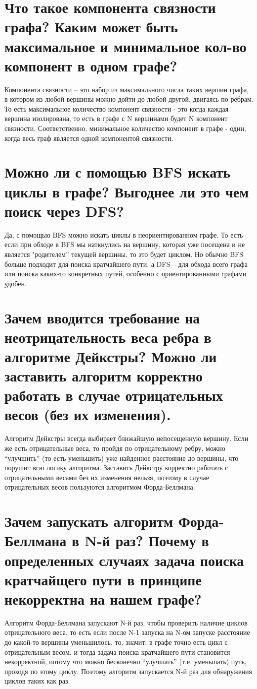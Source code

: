 \documentclass[12pt]{article}
\begin{document}
\section{Что такое компонента связности графа? Каким может быть максимальное и минимальное кол-во компонент в одном графе?}
Компонента связности – это набор из максимального числа таких вершин графа, в котором из любой вершины можно дойти до любой другой, двигаясь по рёбрам. То есть максимальное количество компонент связности - это когда каждая вершина изолирована, то есть в графе с N вершинами будет N компонент связности. Соответственно, минимальное количество компонент в графе - один, когда весь граф является одной компонентой связности.

\section{Можно ли с помощью BFS искать циклы в графе? Выгоднее ли это чем поиск через DFS?}
Да, с помощью BFS можно искать циклы в неориентированном графе. То есть если при обходе в BFS мы наткнулись на вершину, которая уже посещена и не является "родителем'' текущей вершины, то это будет циклом. Но обычно BFS больше подходит для поиска кратчайшего пути, а DFS – для обхода всего графа или поиска каких-то конкретных путей, особенно с ориентированными графами удобен.

\section{Зачем вводится требование на неотрицательность веса ребра в алгоритме Дейкстры? Можно ли заставить алгоритм корректно работать в случае отрицательных весов (без их изменения).}
Алгоритм Дейкстры всегда выбирает ближайшую непосещенную вершину. Если же есть отрицательные веса, то пройдя по отрицательному ребру, можно “улучшить” (то есть уменьшить) уже найденное расстояние до вершины, что порушит всю логику алгоритма. Заставить Дейкстру корректно работать с отрицательными весами без их изменения нельзя, поэтому в случае отрицательных весов пользуются алгоритмом Форда-Беллмана.

\section{Зачем запускать алгоритм Форда-Беллмана в N-й раз? Почему в определенных случаях задача поиска кратчайщего пути в принципе некорректна на нашем графе?}
Алгоритм Форда-Беллмана запускают N-й раз, чтобы проверить наличие циклов отрицательного веса, то есть если после N-1 запуска на N-ом запуске расстояние до какой-то вершины уменьшилось, то, значит, в графе точно есть цикл с отрицательным весом, и тогда задача поиска кратчайшего пути становится некорректной, потому что можно бесконечно “улучшать” (т.е. уменьшать) путь, проходя по этому циклу. Поэтому алгоритм запускается N-й раз для обнаружения циклов таких как раз.
\end{document}
